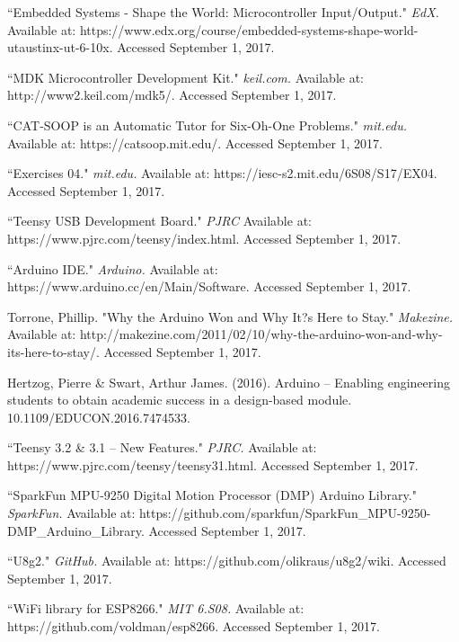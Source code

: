 \documentclass[12pt]{article}
\begin{document}
\clearpage
\raggedright
\begin{thebibliography}{}
``Embedded Systems - Shape the World: Microcontroller Input/Output." \textit{EdX.}  Available at: 
https://www.edx.org/course/embedded-systems-shape-world-utaustinx-ut-6-10x.  Accessed September 1, 2017.

``MDK Microcontroller Development Kit." \textit{keil.com.}  Available at:
http://www2.keil.com/mdk5/. Accessed September 1, 2017.

``CAT-SOOP is an Automatic Tutor for Six-Oh-One Problems."  \textit{mit.edu.}  Available at:
https://catsoop.mit.edu/.  Accessed September 1, 2017.

``Exercises 04."  \textit{mit.edu.} Available at:
https://iesc-s2.mit.edu/6S08/S17/EX04.  Accessed September 1, 2017.

``Teensy USB Development Board."  \textit{PJRC} Available at:
https://www.pjrc.com/teensy/index.html.  Accessed September 1, 2017.

``Arduino IDE." \textit{Arduino.}  Available at:
https://www.arduino.cc/en/Main/Software.  Accessed September 1, 2017.

Torrone, Phillip.  "Why the Arduino Won and Why It?s Here to Stay."  \textit{Makezine.} Available at:
http://makezine.com/2011/02/10/why-the-arduino-won-and-why-its-here-to-stay/.  Accessed September 1, 2017.

Hertzog, Pierre \& Swart, Arthur James. (2016). Arduino -- Enabling engineering students to obtain academic success in a design-based module. 10.1109/EDUCON.2016.7474533.

``Teensy 3.2 \& 3.1 -- New Features." \textit{PJRC.}  Available at:
https://www.pjrc.com/teensy/teensy31.html.  Accessed September 1, 2017.

``SparkFun MPU-9250 Digital Motion Processor (DMP) Arduino Library." \textit{SparkFun.}  Available at: 
https://github.com/sparkfun/SparkFun\_MPU-9250-DMP\_Arduino\_Library.  Accessed September 1, 2017.

``U8g2."  \textit{GitHub.}  Available at: 
https://github.com/olikraus/u8g2/wiki.  Accessed September 1, 2017.

``WiFi library for ESP8266." \textit{MIT 6.S08.}  Available at:
https://github.com/voldman/esp8266.  Accessed September 1, 2017.


\end{thebibliography}
\end{document}
